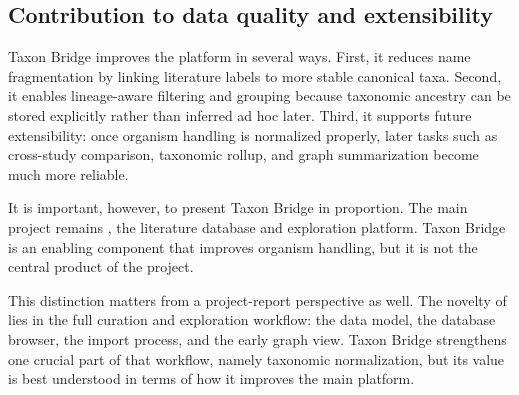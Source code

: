 \subsection{Contribution to data quality and extensibility}

Taxon Bridge improves the platform in several ways. First, it reduces name fragmentation by linking literature labels to more stable canonical taxa. Second, it enables lineage-aware filtering and grouping because taxonomic ancestry can be stored explicitly rather than inferred ad hoc later. Third, it supports future extensibility: once organism handling is normalized properly, later tasks such as cross-study comparison, taxonomic rollup, and graph summarization become much more reliable.

It is important, however, to present Taxon Bridge in proportion. The main project remains \projectname{}, the literature database and exploration platform. Taxon Bridge is an enabling component that improves organism handling, but it is not the central product of the project.

This distinction matters from a project-report perspective as well. The novelty of \projectname{} lies in the full curation and exploration workflow: the data model, the database browser, the import process, and the early graph view. Taxon Bridge strengthens one crucial part of that workflow, namely taxonomic normalization, but its value is best understood in terms of how it improves the main platform.
